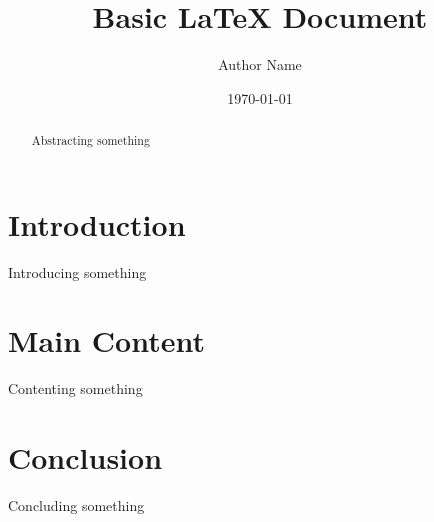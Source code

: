 \documentclass{article}
\title{Basic LaTeX Document}
\author{Author Name}
\date{\today}
\begin{document}
\maketitle

\begin{abstract}
Abstracting something
\end{abstract}

\section{Introduction}
Introducing something

\section{Main Content}
Contenting something
\section{Conclusion}
Concluding something
\end{document}
